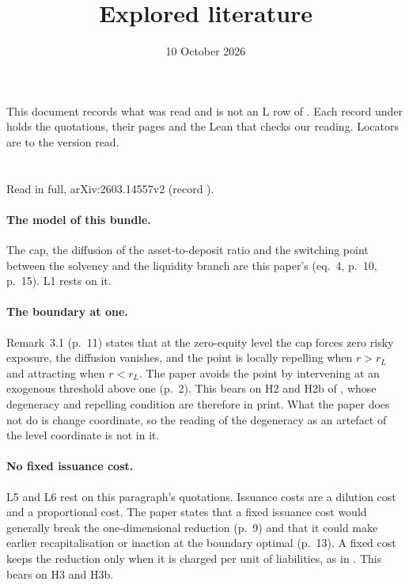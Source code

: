 \documentclass[11pt]{article}
\title{Explored literature}
\date{10 October 2026}
\begin{document}
\maketitle

This document records what was read and is not an L row of
. Each record under  holds the quotations,
their pages and the Lean that checks our reading. Locators are to the version
read.

\section{\citet{bayraktar2026}}

Read in full, arXiv:2603.14557v2 (record ).

\paragraph{The model of this bundle.} The cap, the diffusion of the
asset-to-deposit ratio and the switching point between the solvency and the
liquidity branch are this paper's (eq.~4, p.~10, p.~15). L1 rests on it.

\paragraph{The boundary at one.} Remark~3.1 (p.~11) states that at the
zero-equity level the cap forces zero risky exposure, the diffusion vanishes,
and the point is locally repelling when $r>r_L$ and attracting when $r<r_L$.
The paper avoids the point by intervening at an exogenous threshold above one
(p.~2). This bears on H2 and H2b of , whose degeneracy and
repelling condition are therefore in print. What the paper does not do is
change coordinate, so the reading of the degeneracy as an artefact of the
level coordinate is not in it.

\paragraph{No fixed issuance cost.} L5 and L6 rest on this paragraph's
quotations. Issuance costs are a dilution cost and a proportional cost. The paper states that a fixed issuance cost would
generally break the one-dimensional reduction (p.~9) and that it could make
earlier recapitalisation or inaction at the boundary optimal (p.~13). A fixed
cost keeps the reduction only when it is charged per unit of liabilities, as
in . This bears on H3 and H3b.
\end{document}
